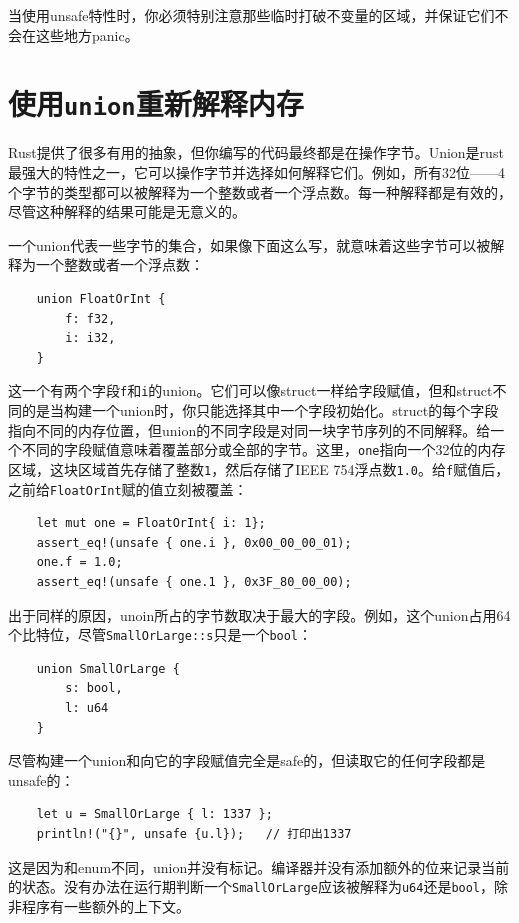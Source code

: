 当使用unsafe特性时，你必须特别注意那些临时打破不变量的区域，并保证它们不会在这些地方panic。

\section{使用\texttt{union}重新解释内存}

Rust提供了很多有用的抽象，但你编写的代码最终都是在操作字节。Union是rust最强大的特性之一，它可以操作字节并选择如何解释它们。例如，所有32位——4个字节的类型都可以被解释为一个整数或者一个浮点数。每一种解释都是有效的，尽管这种解释的结果可能是无意义的。

一个union代表一些字节的集合，如果像下面这么写，就意味着这些字节可以被解释为一个整数或者一个浮点数：
\begin{verbatim}
    union FloatOrInt {
        f: f32,
        i: i32,
    }
\end{verbatim}

这一个有两个字段\texttt{f}和\texttt{i}的union。它们可以像struct一样给字段赋值，但和struct不同的是当构建一个union时，你只能选择其中一个字段初始化。struct的每个字段指向不同的内存位置，但union的不同字段是对同一块字节序列的不同解释。给一个不同的字段赋值意味着覆盖部分或全部的字节。这里，\texttt{one}指向一个32位的内存区域，这块区域首先存储了整数\texttt{1}，然后存储了IEEE 754浮点数\texttt{1.0}。给\texttt{f}赋值后，之前给\texttt{FloatOrInt}赋的值立刻被覆盖：
\begin{verbatim}
    let mut one = FloatOrInt{ i: 1};
    assert_eq!(unsafe { one.i }, 0x00_00_00_01);
    one.f = 1.0;
    assert_eq!(unsafe { one.1 }, 0x3F_80_00_00);
\end{verbatim}

出于同样的原因，unoin所占的字节数取决于最大的字段。例如，这个union占用64个比特位，尽管\texttt{SmallOrLarge::s}只是一个\texttt{bool}：
\begin{verbatim}
    union SmallOrLarge {
        s: bool,
        l: u64
    }
\end{verbatim}

尽管构建一个union和向它的字段赋值完全是safe的，但读取它的任何字段都是unsafe的：
\begin{verbatim}
    let u = SmallOrLarge { l: 1337 };
    println!("{}", unsafe {u.l});   // 打印出1337
\end{verbatim}

这是因为和enum不同，union并没有标记。编译器并没有添加额外的位来记录当前的状态。没有办法在运行期判断一个\texttt{SmallOrLarge}应该被解释为\texttt{u64}还是\texttt{bool}，除非程序有一些额外的上下文。

